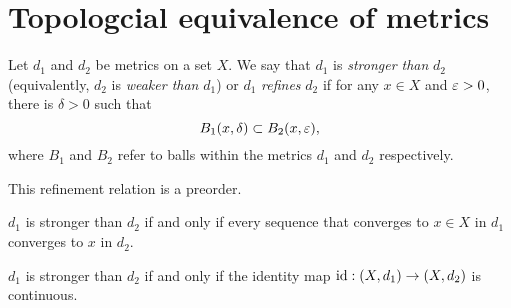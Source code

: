 \documentclass{../note}
\begin{document}
\section{Topologcial equivalence of metrics}
\begin{prb}
Let $d_1$ and $d_2$ be metrics on a set $X$.
We say that $d_1$ is \emph{stronger than} $d_2$ (equivalently, $d_2$ is \emph{weaker than} $d_1$) or $d_1$ \emph{refines} $d_2$ if for any $x\in X$ and $\varepsilon>0$, there is $\delta>0$ such that
\[B_1(x,\delta)\subset B_2(x,\varepsilon),\]
where $B_1$ and $B_2$ refer to balls within the metrics $d_1$ and $d_2$ respectively.
\begin{parts}
\item
This refinement relation is a preorder.
\item
$d_1$ is stronger than $d_2$ if and only if every sequence that converges to $x\in X$ in $d_1$ converges to $x$ in $d_2$.
\item
$d_1$ is stronger than $d_2$ if and only if the identity map $\operatorname{id}:(X,d_1)\to(X,d_2)$ is continuous.
\end{parts}
\end{prb}
\end{document}
